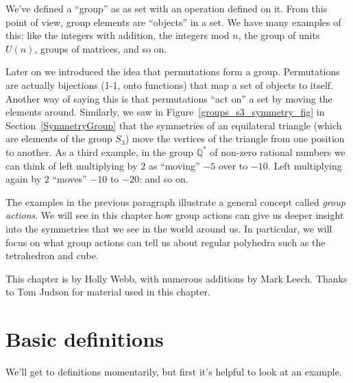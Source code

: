 We've defined a  ``group'' as as set with an operation defined on it.  From this point of view, group elements are ``objects'' in a set. We have many examples of this: like the integers with addition, the integers mod $n$, the group of units $U(n)$, groups of matrices, and so on.

Later on we introduced the idea that permutations form a group. Permutations are actually bijections (1-1, onto functions) that map a set of objects to itself.  Another way of saying this is that permutations ``act on'' a set by moving the elements around.  Similarly, we saw in Figure~\ref{groups_s3_symmetry_fig} in Section~\ref{SymmetryGroup} that the symmetries of an equilateral triangle (which are elements of the group $S_3$) move the vertices of the triangle from one position to another.  As a third example, in the group $\mathbb {Q}^*$ of non-zero rational numbers we can think of left multiplying by $2$ as ``moving''  $-5$ over to $-10$.  Left multiplying again by $2$ ``moves'' $-10$ to $-20$: and so on.   

The examples in the previous paragraph  illustrate a general concept called \emph{group actions}. We will see in this chapter how group actions can give us deeper insight into the symmetries that we see in the world around us. In particular, we will focus on what group actions can tell us about regular polyhedra such as the tetrahedron and cube.
\bigskip

This chapter  is by Holly Webb, with numerous additions by Mark Leech. Thanks to Tom Judson for material used in this chapter.

\section{Basic definitions}\label{DefActions}
We'll get to definitions momentarily, but first it's helpful to look at an example.

